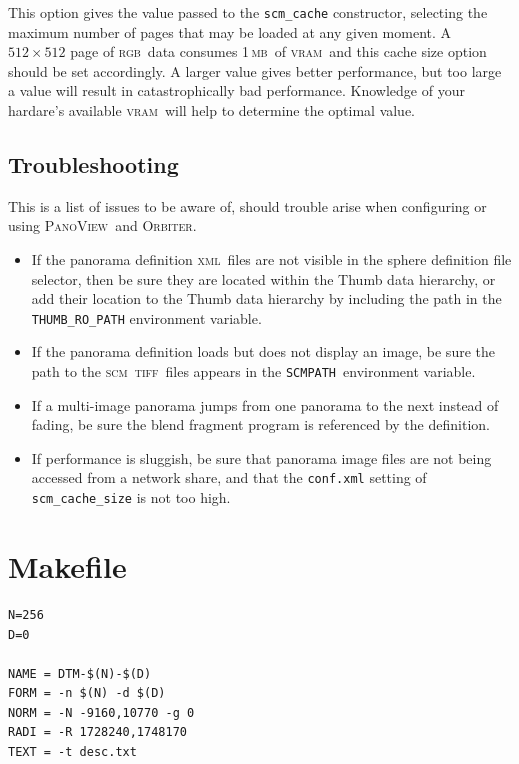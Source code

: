 \documentclass[oneside,10pt]{memoir}
\newcommand{\scm}     {\textsc{scm}}
\newcommand{\tiff}    {\textsc{tiff}}
\newcommand{\xml}     {\textsc{xml}}
\newcommand{\scmpath}{\texttt{SCMPATH}}
\newcommand{\rgb}     {\textsc{rgb}}
\newcommand{\mb}    {\,\textsc{mb}}
\newcommand{\vram}    {\textsc{vram}}
\newcommand{\panoview}{\textsc{PanoView}}
\newcommand{\orbiter} {\textsc{Orbiter}}
\begin{document}
\begin{Spacing}{1.1}
This option gives the value passed to the \texttt{scm\_cache} constructor, selecting the maximum number of pages that may be loaded at any given moment. A $512\times 512$ page of \rgb\ data consumes 1\mb\ of \vram\, and this cache size option should be set accordingly. A larger value gives better performance, but too large a value will result in catastrophically bad performance. Knowledge of your hardare's available \vram\ will help to determine the optimal value.

\section{Troubleshooting}

This is a list of issues to be aware of, should trouble arise when configuring or using \panoview\ and \orbiter.

\begin{itemize}
\item If the panorama definition \xml\ files are not visible in the sphere definition file selector, then be sure they are located within the Thumb data hierarchy, or add their location to the Thumb data hierarchy by including the path in the \verb|THUMB_RO_PATH| environment variable.

\item If the panorama definition loads but does not display an image, be sure the path to the \scm\ \tiff\ files appears in the \scmpath\ environment variable.

\item If a multi-image panorama jumps from one panorama to the next instead of fading, be sure the blend fragment program is referenced by the definition.

\item If performance is sluggish, be sure that panorama image files are not being accessed from a network share, and that the \texttt{conf.xml} setting of \verb|scm_cache_size| is not too high.
\end{itemize}

\appendix
\chapter{Makefile}
\label{cha:makefile}

\begin{Verbatim}
N=256
D=0

NAME = DTM-$(N)-$(D)
FORM = -n $(N) -d $(D)
NORM = -N -9160,10770 -g 0
RADI = -R 1728240,1748170
TEXT = -t desc.txt


\end{Verbatim}
\end{Spacing}
\end{document}
